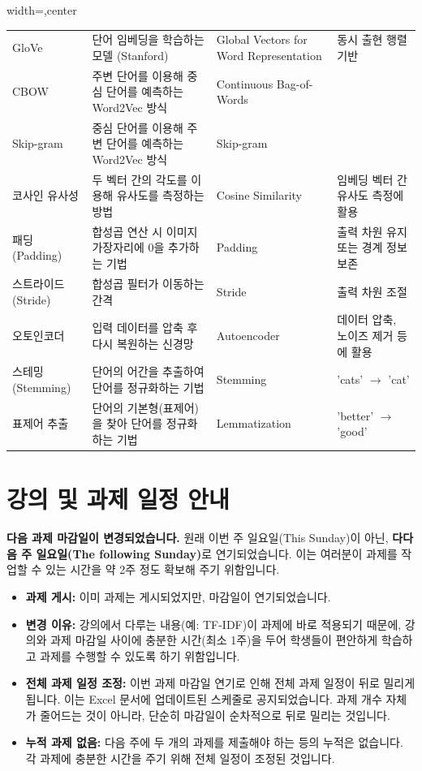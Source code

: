 \documentclass[11pt,a4paper]{article}
\theoremstyle{definition}
\newcommand{\newsection}[1]{\newpage\section{#1}}
\begin{document}
\begin{adjustbox}{width=\textwidth,center}
\begin{tabular}{llll}
GloVe & 단어 임베딩을 학습하는 모델 (Stanford) & Global Vectors for Word Representation & 동시 출현 행렬 기반 \\
CBOW & 주변 단어를 이용해 중심 단어를 예측하는 Word2Vec 방식 & Continuous Bag-of-Words & \\
Skip-gram & 중심 단어를 이용해 주변 단어를 예측하는 Word2Vec 방식 & Skip-gram & \\
코사인 유사성 & 두 벡터 간의 각도를 이용해 유사도를 측정하는 방법 & Cosine Similarity & 임베딩 벡터 간 유사도 측정에 활용 \\
패딩 (Padding) & 합성곱 연산 시 이미지 가장자리에 0을 추가하는 기법 & Padding & 출력 차원 유지 또는 경계 정보 보존 \\
스트라이드 (Stride) & 합성곱 필터가 이동하는 간격 & Stride & 출력 차원 조절 \\
오토인코더 & 입력 데이터를 압축 후 다시 복원하는 신경망 & Autoencoder & 데이터 압축, 노이즈 제거 등에 활용 \\
스테밍 (Stemming) & 단어의 어간을 추출하여 단어를 정규화하는 기법 & Stemming & 'cats' $\rightarrow$ 'cat' \\
표제어 추출 & 단어의 기본형(표제어)을 찾아 단어를 정규화하는 기법 & Lemmatization & 'better' $\rightarrow$ 'good' \\
\bottomrule
\end{tabular}
\end{adjustbox}

\newsection{강의 및 과제 일정 안내}

\begin{tcolorbox}[importantbox, title=⚠️ 과제 마감일 변경]
\textbf{다음 과제 마감일이 변경되었습니다.}
원래 이번 주 일요일(This Sunday)이 아닌, \textbf{다다음 주 일요일(The following Sunday)}로 연기되었습니다.
이는 여러분이 과제를 작업할 수 있는 시간을 약 2주 정도 확보해 주기 위함입니다.
\end{tcolorbox}

\begin{itemize}
    \item \textbf{과제 게시:} 이미 과제는 게시되었지만, 마감일이 연기되었습니다.
    \item \textbf{변경 이유:} 강의에서 다루는 내용(예: TF-IDF)이 과제에 바로 적용되기 때문에, 강의와 과제 마감일 사이에 충분한 시간(최소 1주)을 두어 학생들이 편안하게 학습하고 과제를 수행할 수 있도록 하기 위함입니다.
    \item \textbf{전체 과제 일정 조정:} 이번 과제 마감일 연기로 인해 전체 과제 일정이 뒤로 밀리게 됩니다. 이는 Excel 문서에 업데이트된 스케줄로 공지되었습니다. 과제 개수 자체가 줄어드는 것이 아니라, 단순히 마감일이 순차적으로 뒤로 밀리는 것입니다.
    \item \textbf{누적 과제 없음:} 다음 주에 두 개의 과제를 제출해야 하는 등의 누적은 없습니다. 각 과제에 충분한 시간을 주기 위해 전체 일정이 조정된 것입니다.
\end{itemize}
\end{document}
